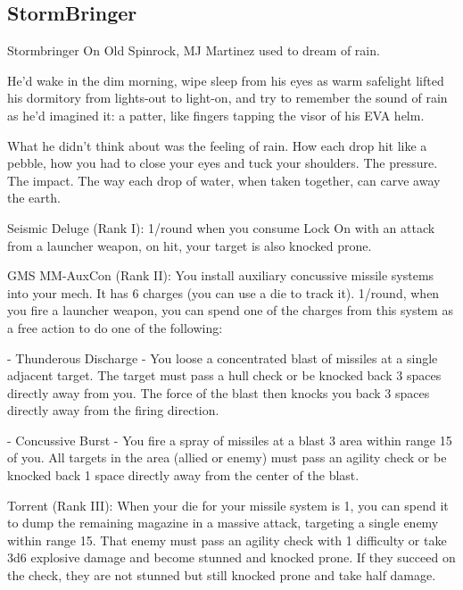\subsection{StormBringer}

                                                Stormbringer  
On Old Spinrock, MJ Martinez used to dream of rain.   

He’d wake in the dim morning, wipe sleep from his eyes as warm safelight lifted his dormitory  
from lights-out to light-on, and try to remember the sound of rain as he’d imagined it: a patter, like  
fingers tapping the visor of his EVA helm.   

What he didn’t think about was the feeling of rain. How each drop hit like a pebble, how you had  
to close your eyes and tuck your shoulders. The pressure. The impact.   
The way each drop of water, when taken together, can carve away the earth.  

Seismic Deluge (Rank I): 1/round when you consume Lock On with an attack from a launcher  
weapon, on hit, your target is also knocked prone.
 
GMS MM-AuxCon (Rank II): You install auxiliary concussive missile systems into your mech. It  
has 6 charges (you can use a die to track it). 1/round, when you fire a launcher weapon, you can  
spend one of the charges from this system as a free action to do one of the following:
 
             -    Thunderous Discharge - You loose a concentrated blast of missiles at a single  
                  adjacent target. The target must pass a hull check or be knocked back 3 spaces  
                  directly away from you. The force of the blast then knocks you back 3 spaces  
                  directly away from the firing direction.
 
             -    Concussive Burst - You fire a spray of missiles at a blast 3 area within range 15 of  
                  you. All targets in the area (allied or enemy) must pass an agility check or be  
                  knocked back 1 space directly away from the center of the blast.
 
Torrent (Rank III): When your die for your missile system is 1, you can spend it to dump the  
remaining magazine in a massive attack, targeting a single enemy within range 15. That enemy  
must pass an agility check with 1 difficulty or take 3d6 explosive damage and become stunned  
and knocked prone. If they succeed on the check, they are not stunned but still knocked prone  
and take half damage.
 